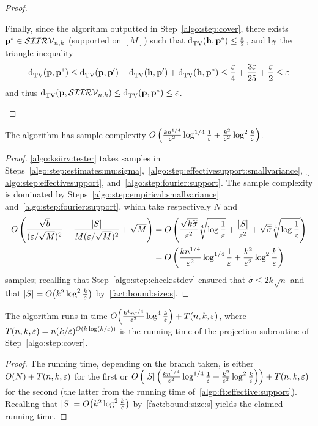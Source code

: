 \begin{proof}
\begin{itemize}
  Finally, since the algorithm outputted \accept in Step~\ref{algo:step:cover}, there exists $\p^\ast\in\classksiirv[n]{k}$ (supported on $[M]$) such that $\totalvardist{\h}{\p^\ast}\leq \frac{\eps}{2}$, and by the triangle inequality
  \[
      \totalvardist{\p}{\p^\ast} \leq \totalvardist{\p}{\p'} + \totalvardist{\h}{\p'} + \totalvardist{\h}{\p^\ast} \leq \frac{\eps}{4} + \frac{3\eps}{25} + \frac{\eps}{2} \leq \eps
  \]
  and thus $ \totalvardist{\p}{\classksiirv[n]{k}} \leq \totalvardist{\p}{\p^\ast} \leq \eps$.
 \end{itemize}
\end{proof}

\begin{lemma}\label{lemma:sample:complexity}
  The algorithm has sample complexity $O\left( \frac{k n^{1/4}}{\eps^2}\log^{1/4}\frac{1}{\eps} + \frac{k^2}{\eps^2} \log^2\frac{k}{\eps} \right)$.
\end{lemma}
\begin{proof}  \cref{algo:ksiirv:tester} takes samples in Steps~\ref{algo:step:estimates:mu:sigma},~\ref{algo:step:effectivesupport:smallvariance},~\ref{algo:step:effectivesupport}, and~\ref{algo:step:fourier:support}. The sample complexity is dominated by Steps~\ref{algo:step:empirical:smallvariance} and~\ref{algo:step:fourier:support}, which take respectively $N$ and 
  \begin{align*}
    O\left( \frac{\sqrt{b}}{(\eps/\sqrt{M})^2} + \frac{\abs{S}}{M(\eps/\sqrt{M})^2} + \sqrt{M} \right) 
    &= O\left( \frac{\sqrt{k \widetilde{\sigma}}}{\eps^2}\sqrt[4]{\log\frac{1}{\eps}} 
        + \frac{\abs{S}}{\eps^2}
        + \sqrt{\widetilde{\sigma}}\sqrt[4]{\log\frac{1}{\eps}} \right)
    \\
    &= O\left( \frac{k n^{1/4}}{\eps^2}\log^{1/4}\frac{1}{\eps} + \frac{k^2}{\eps^2}\log^2\frac{k}{\eps} \right)
  \end{align*}
  samples; recalling that Step~\ref{algo:step:check:stdev} ensured that $\widetilde{\sigma} \leq 2k\sqrt{n}$ and that $\abs{S}=\bigO{k^2\log^2\frac{k}{\eps}}$ by~\cref{fact:bound:size:s}.
\end{proof}


\begin{lemma}\label{lemma:running:time}
  The algorithm runs in time $\bigO{ \frac{k^4n^{1/4}}{\eps^2}\log^{4}\frac{k}{\eps} } + T(n,k,\eps)$, where $T(n,k,\eps)=n(k/\eps)^{\bigO{k\log(k/\eps)}}$ is the running time of the projection subroutine of Step~\ref{algo:step:cover}.
\end{lemma}
\begin{proof}  The running time, depending on the branch taken, is either $O(N)+T(n,k,\eps)$ for the first or $O\left( \abs{S}\left(\frac{k n^{1/4}}{\eps^2}\log^{1/4}\frac{1}{\eps} + \frac{k^2}{\eps^2}\log^2\frac{k}{\eps}\right) \right)+T(n,k,\eps)$ for the second (the latter from the running time of~\cref{algo:ft:effective:support}). Recalling that $\abs{S}=\bigO{k^2\log^2\frac{k}{\eps}}$ by~\cref{fact:bound:size:s} yields the claimed running time.
\end{proof}

